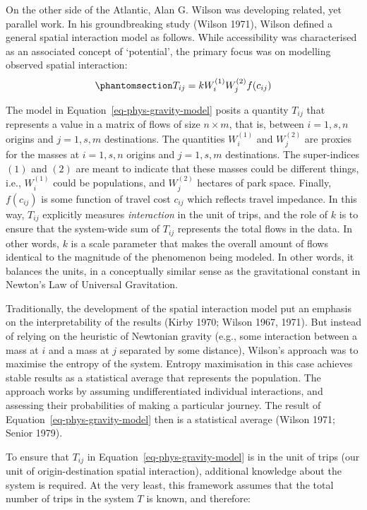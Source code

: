 \documentclass[
]{article}
\begin{document}
On the other side of the Atlantic, Alan G. Wilson was developing
related, yet parallel work. In his groundbreaking study (Wilson 1971),
Wilson defined a general spatial interaction model as follows. While
accessibility was characterised as an associated concept of `potential',
the primary focus was on modelling observed spatial interaction:
\begin{equation}\phantomsection\label{eq-phys-gravity-model}{
T_{ij} = k W_i^{(1)} W_j^{(2)} f(c_{ij})
}\end{equation}

The model in Equation~\ref{eq-phys-gravity-model} posits a quantity
\(T_{ij}\) that represents a value in a matrix of flows of size
\(n \times m\), that is, between \(i = 1,s, n\) origins and
\(j = 1,s, m\) destinations. The quantities \(W_i^{(1)}\) and
\(W_j^{(2)}\) are proxies for the masses at \(i=1,s,n\) origins and
\(j=1,s,m\) destinations. The super-indices \((1)\) and \((2)\) are
meant to indicate that these masses could be different things, i.e.,
\(W_i^{(1)}\) could be populations, and \(W_j^{(2)}\) hectares of park
space. Finally, \(f(c_{ij})\) is some function of travel cost \(c_{ij}\)
which reflects travel impedance. In this way, \(T_{ij}\) explicitly
measures \emph{interaction} in the unit of trips, and the role of \(k\)
is to ensure that the system-wide sum of \(T_{ij}\) represents the total
flows in the data. In other words, \(k\) is a scale parameter that makes
the overall amount of flows identical to the magnitude of the phenomenon
being modeled. In other words, it balances the units, in a conceptually
similar sense as the gravitational constant in Newton's Law of Universal
Gravitation.

Traditionally, the development of the spatial interaction model put an
emphasis on the interpretability of the results (Kirby 1970; Wilson
1967, 1971). But instead of relying on the heuristic of Newtonian
gravity (e.g., some interaction between a mass at \(i\) and a mass at
\(j\) separated by some distance), Wilson's approach was to maximise the
entropy of the system. Entropy maximisation in this case achieves stable
results as a statistical average that represents the population. The
approach works by assuming undifferentiated individual interactions, and
assessing their probabilities of making a particular journey. The result
of Equation~\ref{eq-phys-gravity-model} then is a statistical average
(Wilson 1971; Senior 1979).

To ensure that \(T_{ij}\) in Equation~\ref{eq-phys-gravity-model} is in
the unit of trips (our unit of origin-destination spatial interaction),
additional knowledge about the system is required. At the very least,
this framework assumes that the total number of trips in the system
\(T\) is known, and therefore:
\end{document}
